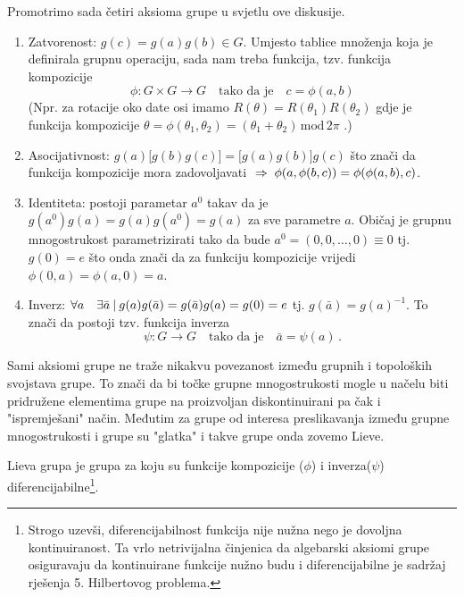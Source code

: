 Promotrimo sada četiri aksioma grupe u svjetlu ove diskusije.
\begin{enumerate}
\item Zatvorenost: $g(c)=g(a)g(b) \in G$. Umjesto tablice množenja koja
    je definirala grupnu operaciju, sada nam treba funkcija, tzv.
    funkcija kompozicije
    \[\phi: G\times G \to G \quad  \text{tako da je} \quad c=\phi(a,b) \]
    (Npr. za rotacije oko date osi imamo $R(\theta) = R(\theta_1) R(\theta_2)$
    gdje je funkcija kompozicije  $\theta = \phi(\theta_1, \theta_2) =
    (\theta_1 + \theta_2)\, \mathrm{mod}\, 2\pi$ .)

\item Asocijativnost: $g(a)\big[g(b)g(c)\big]=\big[g(a)g(b)\big]g(c)$ što
    znači da funkcija kompozicije mora zadovoljavati
    $\;\Rightarrow\; \phi(a, \phi(b,c))=\phi(\phi(a,b),c) $.

\item Identiteta: postoji parametar $a^0$ takav da je 
       $g(a^0)g(a)=g(a)g(a^0)=g(a)$ za sve parametre $a$.
    Običaj je grupnu mnogostrukost parametrizirati tako da bude $a^0=(0, 0, \ldots, 0)
     \equiv 0$ tj. $g(0)=e$ što onda znači da za funkciju
     kompozicije vrijedi $\phi(0,a)=\phi(a,0)=a$.

\item Inverz: $\forall a\quad \exists \bar{a} \: | \: g(a)g(\bar{a})=
        g(\bar{a})g(a)=g(0)=e$ tj. $g(\bar{a})=g(a)^{-1}$. To znači
        da postoji tzv. funkcija inverza
        \[ \psi:G\to G   \quad  \text{tako da je} \quad \bar{a}=\psi(a) \,. \]

\end{enumerate}

Sami aksiomi grupe ne traže nikakvu povezanost između grupnih i topoloških
svojstava grupe. To znači da bi točke grupne mnogostrukosti mogle u načelu biti
pridružene elementima grupe na proizvoljan diskontinuirani pa čak i "ispremješani"
način. Međutim za grupe od interesa preslikavanja između grupne mnogostrukosti
i grupe su "glatka" i takve grupe onda zovemo Lieve.

\begin{definicija}
  Lieva grupa je grupa za koju su funkcije kompozicije
($\phi$) i inverza($\psi$) diferencijabilne\footnote{Strogo uzevši, 
    diferencijabilnost funkcija nije nužna nego je dovoljna
 kontinuiranost. Ta vrlo netrivijalna činjenica da algebarski aksiomi
 grupe osiguravaju da kontinuirane funkcije nužno budu i diferencijabilne
 je sadržaj rješenja 5. Hilbertovog problema.}.
\end{definicija}

